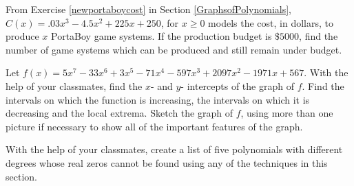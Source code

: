 \documentclass{ximera}
\begin{document}
\begin{problem}
From Exercise \ref{newportaboycost} in Section \ref{GraphsofPolynomials}, $C(x) = .03x^{3} - 4.5x^{2} + 225x + 250$, for $x \geq 0$ models the cost, in dollars, to produce $x$ PortaBoy game systems. If the production budget is $\$5000$, find the number of game systems which can be produced and still remain under budget.
\end{problem}

\begin{problem}
Let $f(x) = 5x^{7} - 33x^{6} + 3x^{5} - 71x^{4} - 597x^{3} + 2097x^{2} - 1971x + 567$.  With the help of your classmates, find the $x$- and $y$- intercepts of the graph of $f$.  Find the intervals on which the function is increasing, the intervals on which it is decreasing and the local extrema.  Sketch the graph of $f$, using more than one picture if necessary to show all of the important features of the graph.  
\end{problem}

\begin{problem}
With the help of your classmates, create a list of five polynomials with different degrees whose real zeros cannot be found using any of the techniques in this section.
\end{problem}
\end{document}
